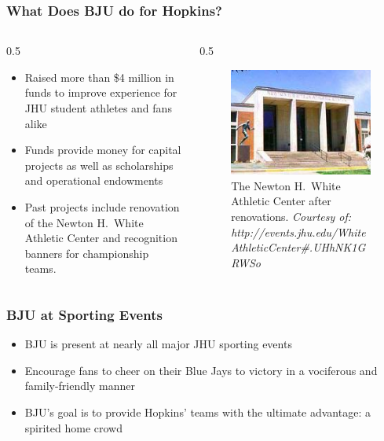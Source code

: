 \documentclass[compress,handout,10pt]{beamer}
\let\olditem\item
\renewcommand{\item}{\setlength{\itemsep}{0.5\baselineskip}\olditem}
\begin{document}
\begin{frame}
	\frametitle{What Does BJU do for Hopkins?}
	\begin {columns}
		\begin {column} {0.5\textwidth}
			\begin {itemize}
				\item Raised more than \$4 million in funds to improve experience for JHU student athletes and fans alike \cite{bjuwebsite}
				\item Funds provide money for capital projects as well as scholarships and operational endowments \cite{bjuwebsite}
				\item Past projects include renovation of the Newton H.~White Athletic Center and recognition banners for championship teams. \cite{bjuwebsite}
			\end {itemize}
		\end {column}
		\begin{column} {0.5\textwidth}
			\begin{figure}
			\begin{center}
				\includegraphics [width=2in] {AthleticCenter.jpg}
				\caption{{\tiny The Newton H.~White Athletic Center after renovations. \textit{Courtesy of: http://events.jhu.edu/WhiteAthleticCenter\#.UHhNK1GRWSo}}}
			\end{center}
			\end {figure}
		\end {column}
	\end {columns}
\end {frame}   

\begin{frame}
    \frametitle{BJU at Sporting Events}
    \begin{itemize}
    	\item BJU is present at nearly all major JHU sporting events
    	\item Encourage fans to cheer on their Blue Jays to victory in a vociferous and family-friendly manner
    	\item BJU's goal is to provide Hopkins' teams with the ultimate advantage: a spirited home crowd
    \end{itemize}
\end{frame}
\end{document}

